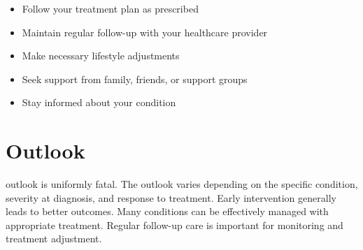 \begin{itemize}[noitemsep]
  \item Follow your treatment plan as prescribed
  \item Maintain regular follow-up with your healthcare provider
  \item Make necessary lifestyle adjustments
  \item Seek support from family, friends, or support groups
  \item Stay informed about your condition
\end{itemize}
\section{Outlook}
outlook is uniformly fatal. The outlook varies depending on the specific condition, severity at diagnosis, and response to treatment. Early intervention generally leads to better outcomes. Many conditions can be effectively managed with appropriate treatment. Regular follow-up care is important for monitoring and treatment adjustment.
